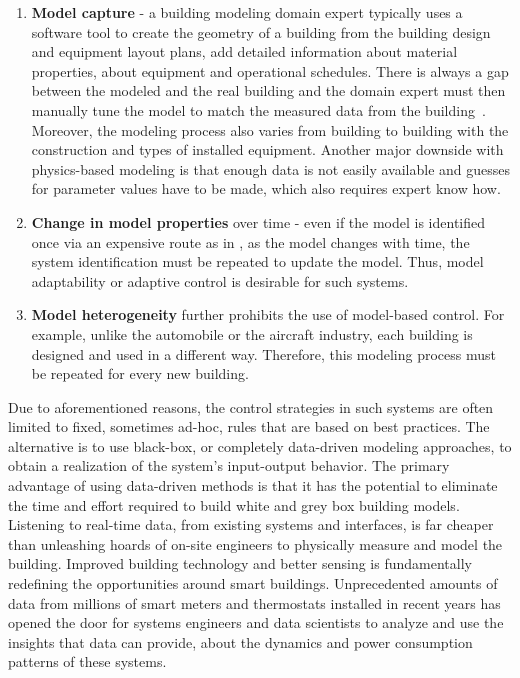 \begin{enumerate}
	\item \textbf{Model capture} - a building modeling domain expert typically uses a software tool to create the geometry of a building from the building design and equipment layout plans, add detailed information about material properties, about equipment and operational schedules. There is always a gap between the modeled and the real building and the domain expert must then manually tune the model to match the measured data from the building~\cite{New2012}. 
Moreover, the modeling process also varies from building to building with the construction and types of installed equipment.
Another major downside with physics-based modeling is that enough data is not easily available and guesses for parameter values have to be made, which also requires expert know how.

\item \textbf{Change in model properties} over time - even if the model is identified once via an expensive route as in \cite{Sturzenegger2016}, as the model changes with time, the system identification must be repeated to update the model. Thus, model adaptability or adaptive control is desirable for such systems. 

\item \textbf{Model heterogeneity} further prohibits the use of model-based control. For example, unlike the automobile or the aircraft industry, each building is designed and used in a different way. Therefore, this modeling process must be repeated for every new building. 
\end{enumerate}

Due to aforementioned reasons, the control strategies in such systems are often limited to fixed, sometimes ad-hoc, rules that are based on best practices. 
The alternative is to use black-box, or completely data-driven modeling approaches, to obtain a realization of the system's input-output behavior. 
The primary advantage of using data-driven methods is that it has the potential to eliminate the time and effort required to build white and grey box building models. 
Listening to real-time data, from existing systems and interfaces, is far cheaper than unleashing hoards of on-site engineers to physically measure and model the building. Improved building technology and better sensing is fundamentally redefining the opportunities around smart buildings. 
Unprecedented amounts of data from millions of smart meters and thermostats installed in recent years has opened the door for systems engineers and data scientists to analyze and use the insights that data can provide, about the dynamics and power consumption patterns of these systems. 

